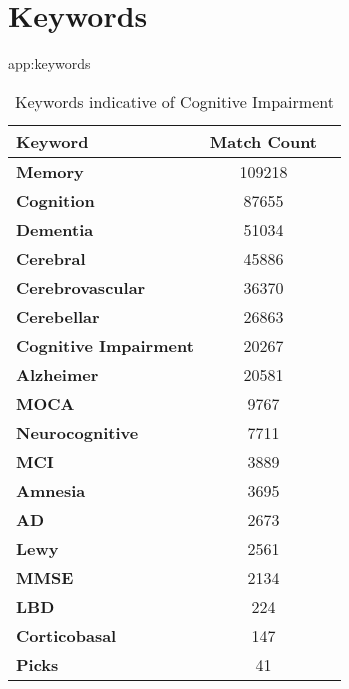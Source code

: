 \documentclass[pmlr,twocolumn,10pt]{jmlr} %
\begin{document}
\section{Keywords} 
\begin{table}[hbtp] 
\floatconts
{app:keywords}
{\caption{Keywords indicative of Cognitive Impairment}}
\centering
    \begin{tabular}{lcc}
        \toprule
        \bfseries Keyword & \bfseries Match Count \\
        \midrule
        
        \bfseries Memory & 109218 \\ 
        \bfseries Cognition & 87655 \\ 
        \bfseries Dementia & 51034 \\ 
        \bfseries Cerebral & 45886 \\ 
        \bfseries Cerebrovascular & 36370 \\ 
        \bfseries Cerebellar & 26863 \\
        \bfseries Cognitive Impairment & 20267 \\ 
        \bfseries Alzheimer & 20581 \\ 
        \bfseries MOCA & 9767 \\ 
        \bfseries Neurocognitive & 7711 \\ 
        \bfseries MCI & 3889 \\ 
        \bfseries Amnesia & 3695 \\ 
        \bfseries AD & 2673 \\ 
        \bfseries Lewy & 2561 \\ 
        \bfseries MMSE & 2134 \\ 
        \bfseries LBD & 224 \\ 
        \bfseries Corticobasal & 147 \\ 
        \bfseries Picks & 41 \\ 
        
        \bottomrule
        \end{tabular}
        
\end{table}

\end{document}
